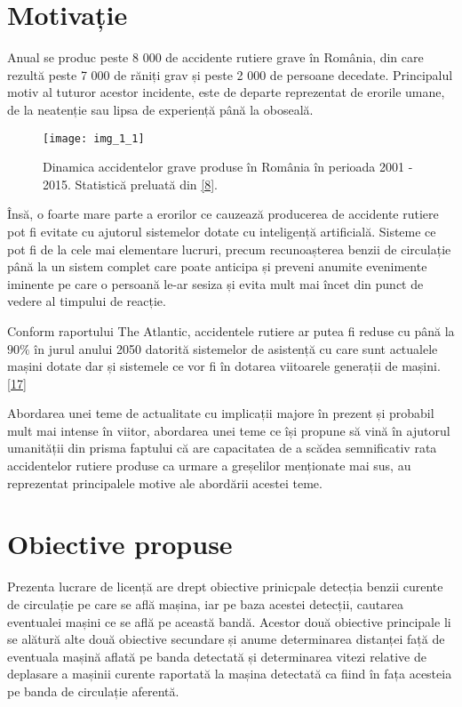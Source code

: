 \section{Motivație}

Anual se produc peste 8 000 de accidente rutiere grave în România, din care rezultă peste 7 000 de răniți grav și peste 2 000 de persoane decedate. Principalul motiv al tuturor acestor incidente, este de departe reprezentat de erorile umane, de la neatenție sau lipsa de experiență până la oboseală.
\begin{figure}[!h]
	\centering
	\texttt{[image: img\_1\_1]}
	\caption[Dinamica accidente rutiere]{Dinamica accidentelor grave produse în România în perioada 2001 - 2015. Statistică preluată din \hyperlink{Dinamicaaccidentelorrutiere}{[8]}.}
\end{figure} 

Însă, o foarte mare parte a erorilor ce cauzează producerea de accidente rutiere pot fi evitate cu ajutorul sistemelor dotate cu inteligență artificială. Sisteme ce pot fi de la cele mai elementare lucruri, precum recunoașterea benzii de circulație până la un sistem complet care poate anticipa și preveni anumite evenimente iminente pe care o persoană le-ar sesiza și evita mult mai încet din punct de vedere al timpului de reacție.

Conform raportului The Atlantic, accidentele rutiere ar putea fi reduse cu până la $90\%$ în jurul anului 2050 datorită sistemelor de asistență cu care sunt actualele mașini dotate dar și sistemele ce vor fi în dotarea viitoarele generații de mașini. \hyperlink{TheAtlantic}{[17]}

Abordarea unei teme de actualitate cu implicații majore în prezent și probabil mult mai intense în viitor, abordarea unei teme ce își propune să vină în ajutorul umanității din prisma faptului că are capacitatea de a scădea semnificativ rata accidentelor rutiere produse ca urmare a greșelilor menționate mai sus, au reprezentat principalele motive ale abordării acestei teme.

\section{Obiective propuse}

Prezenta lucrare de licență are drept obiective prinicpale detecția benzii curente de circulație pe care se află mașina, iar pe baza acestei detecții, cautarea eventualei mașini ce se află pe această bandă. 
Acestor două obiective principale li se alătură alte două obiective secundare și anume determinarea distanței față de eventuala mașină aflată pe banda detectată și determinarea vitezi relative de deplasare a mașinii curente raportată la mașina detectată ca fiind în fața acesteia pe banda de circulație aferentă.


